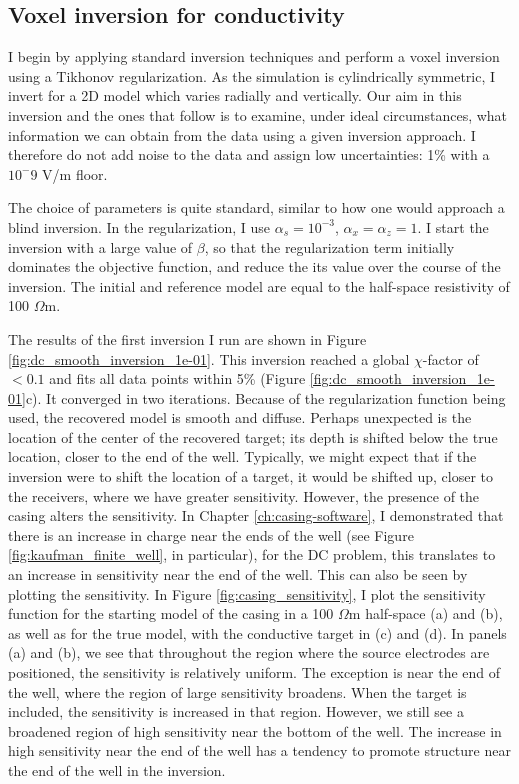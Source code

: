 

\subsection{Voxel inversion for conductivity}
\label{sec:voxel_inversion}

I begin by applying standard inversion techniques and perform a voxel inversion using a Tikhonov regularization. As the simulation is cylindrically symmetric, I invert for a 2D model which varies radially and vertically. Our aim in this inversion and the ones that follow is to examine, under ideal circumstances, what information we can obtain from the data using a given inversion approach. I therefore do not add noise to the data and assign low uncertainties: 1\% with a $10^-9$ V/m floor.

The choice of parameters is quite standard, similar to how one would approach a blind inversion. In the regularization, I use $\alpha_s = 10^{-3}$, $\alpha_x = \alpha_z = 1$. I start the inversion with a large value of $\beta$, so that the regularization term initially dominates the objective function, and reduce the its value over the course of the inversion. The initial and reference model are equal to the half-space resistivity of 100 $\Omega$m.

The results of the first inversion I run are shown in Figure \ref{fig:dc_smooth_inversion_1e-01}. This inversion reached a global $\chi$-factor of $<0.1$ and fits all data points within 5\% (Figure \ref{fig:dc_smooth_inversion_1e-01}c). It converged in two iterations.  Because of the regularization function being used, the recovered model is smooth and diffuse. Perhaps unexpected is the location of the center of the recovered target; its depth is shifted below the true location, closer to the end of the well. Typically, we might expect that if the inversion were to shift the location of a target, it would be shifted up, closer to the receivers, where we have greater sensitivity. However, the presence of the casing alters the sensitivity. In Chapter \ref{ch:casing-software}, I demonstrated that there is an increase in charge near the ends of the well (see Figure \ref{fig:kaufman_finite_well}, in particular), for the DC problem, this translates to an increase in sensitivity near the end of the well. This can also be seen by plotting the sensitivity. In Figure \ref{fig:casing_sensitivity}, I plot the sensitivity function for the starting model of the casing in a 100 $\Omega$m half-space (a) and (b), as well as for the true model, with the conductive target in (c) and (d). In panels (a) and (b), we see that throughout the region where the source electrodes are positioned, the sensitivity is relatively uniform. The exception is near the end of the well, where the region of large sensitivity broadens. When the target is included, the sensitivity is increased in that region. However, we still see a broadened region of high sensitivity near the bottom of the well. The increase in high sensitivity near the end of the well has a tendency to promote structure near the end of the well in the inversion.



